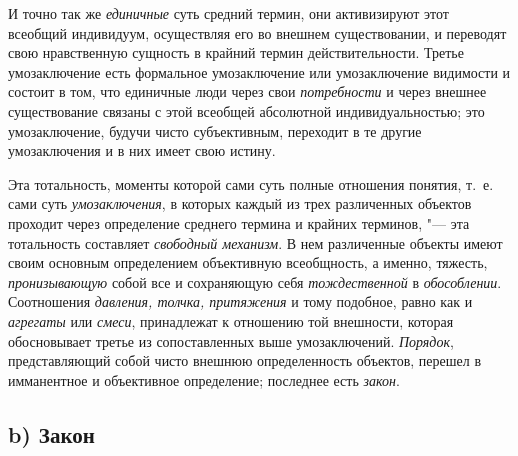 И точно так же
{\em единичные} суть
средний термин, они активизируют этот всеобщий индивидуум, осуществляя его
во внешнем существовании, и переводят свою нравственную сущность в крайний
термин
действительности.
Третье умозаключение есть формальное умозаключение или
умозаключение видимости и состоит в том, что единичные люди через свои
{\em потребности} и через
внешнее существование связаны с этой всеобщей абсолютной индивидуальностью;
это умозаключение, будучи чисто субъективным, переходит в те другие
умозаключения и в них имеет свою
истину\label{bkm:bm52c}.

Эта тотальность, моменты которой сами суть полные отношения
понятия, т.~е. сами суть
{\em умозаключения}, в
которых каждый из трех различенных объектов проходит через определение
среднего термина и крайних терминов, "--- эта тотальность
составляет {\em свободный механизм}.
В нем различенные объекты имеют своим основным определением
объективную всеобщность, а именно, тяжесть,
{\em пронизывающую} собой
все и сохраняющую себя
{\em тождественной} в
{\em обособлении}.
Соотношения {\em давления,
толчка, притяжения} и тому подобное, равно как и
{\em агрегаты} или
{\em смеси}, принадлежат
к отношению той внешности, которая обосновывает третье из
сопоставленных выше умозаключений.
{\em Порядок},
представляющий собой чисто внешнюю определенность объектов,
перешел в имманентное и объективное определение; последнее есть
{\em закон}.

\subsection[b) Закон]{b) Закон}

